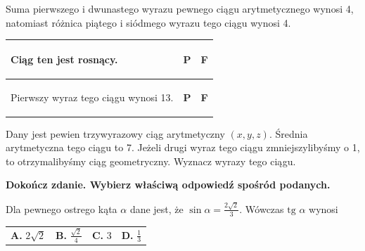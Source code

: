 \documentclass[12pt,a4paper]{article}
\theoremstyle{break}
\begin{document}
	Suma pierwszego i dwunastego wyrazu pewnego ciągu arytmetycznego wynosi 4, natomiast różnica piątego i siódmego wyrazu tego ciągu wynosi 4.
	
	\vspace{0.5cm}
	\begin{tabular}{|p{12.5cm}|p{1cm}|p{1cm}|}
		
		\hline
		\begin{flushleft}
			Ciąg ten jest rosnący.
		\end{flushleft}&\begin{center}
			\textbf{P}
		\end{center}&\begin{center}
			\textbf{F}
		\end{center}\\
		\hline
		\begin{flushleft}
			Pierwszy wyraz tego ciągu wynosi 13.
		\end{flushleft}&\begin{center}
			\textbf{P}
		\end{center}&\begin{center}
			\textbf{F}
		\end{center}\\
		\hline
	\end{tabular}
	
	\begin{zad}[0-4]
		Dany jest pewien trzywyrazowy ciąg arytmetyczny $(x,y,z)$. Średnia arytmetyczna tego ciągu to 7. Jeżeli drugi wyraz tego ciągu zmniejszylibyśmy o 1, to otrzymalibyśmy ciąg geometryczny. Wyznacz wyrazy tego ciągu.
	\end{zad} 

	\newpage
	
	\begin{zad}[0-1]
		\textbf{Dokończ zdanie. Wybierz właściwą odpowiedź spośród podanych.}
	\end{zad} 
	
	Dla pewnego ostrego kąta $\alpha$ dane jest, że $\sin\alpha = \frac{2\sqrt{2}}{3}$. Wówczas $\text{tg }\alpha$ wynosi
	
	\vspace{0.5cm}
	\begin{tabular}{p{3.5cm} p{3.5cm} p{3.5cm} p{3.5cm}}
		\textbf{A. }$2\sqrt{2}$&
		\textbf{B. }$\frac{\sqrt{2}}{4}$&
		\textbf{C. }$3$&
		\textbf{D. }$\frac{1}{3}$\\
	\end{tabular}
	
\end{document}
